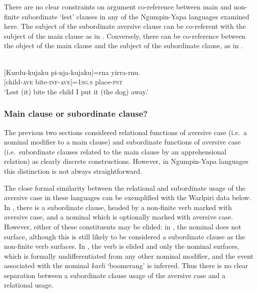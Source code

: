 \documentclass[output=paper,colorlinks,citecolor=brown]{langscibook}
\begin{document}
 There are no clear constraints on argument co-reference between main and non-finite subordinate `lest' clauses in any of the Ngumpin-Yapa languages examined here. The subject of the subordinate aversive clause can be co-referent with the subject of the main clause as in . Conversely, there can be co-reference between the object of the main clause and the subject of the subordinate clause, as in .

\ea
{} {\citealt[5]{laughren_expressing_2015}} \\
\gll $[$Kurdu-kujaku pi-nja-kujaku$]$=rna yirra-rnu. \\
$[$child-\textsc{ave} bite-\textsc{inf-ave}$]$=\textsc{1sg.s} place-\textsc{pst} \\
\glt `Lest (it) bite the child I put it (the dog) away.'
\label{ex:bro26}
\z

\subsubsection{Main clause or subordinate clause?}
\label{subsubsec:clause}

The previous two sections considered relational functions of aversive case (i.e.\  a nominal modifier to a main clause) and subordinate functions of aversive case (i.e.\  subordinate clauses related to the main clause by an apprehensional relation) as clearly discrete constructions. However, in Ngumpin-Yapa languages this distinction is not always straightforward.

The close formal similarity between the relational and subordinate usage of the aversive case in these languages can be exemplified with the Warlpiri data below. In , there is a subordinate clause, headed by a non-finite verb marked with aversive case, and a nominal which is optionally marked with aversive case. However, either of these constituents may be elided: in , the nominal does not surface, although this is still likely to be considered a subordinate clause as the non-finite verb surfaces. In , the verb is elided and only the nominal surfaces, which is formally undifferentiated from any other nominal modifier, and the event associated with the nominal \textit{karli} `boomerang' is inferred. Thus there is no clear separation between a subordinate clause usage of the aversive case and a relational usage.
\end{document}
